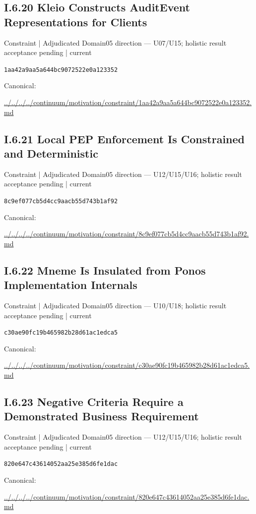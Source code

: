\documentclass[10pt,a4paper]{article}
\begin{document}
\subsection*{I.6.20 Kleio Constructs AuditEvent Representations for Clients}
{\small Constraint | Adjudicated Domain05 direction — U07/U15; holistic result acceptance pending | current}\par
\texttt{1aa42a9aa5a644bc9072522e0a123352}\par
Canonical: \par
{\footnotesize\url{../../../../continuum/motivation/constraint/1aa42a9aa5a644bc9072522e0a123352.md}}\par
\subsection*{I.6.21 Local PEP Enforcement Is Constrained and Deterministic}
{\small Constraint | Adjudicated Domain05 direction — U12/U15/U16; holistic result acceptance pending | current}\par
\texttt{8c9ef077cb5d4cc9aacb55d743b1af92}\par
Canonical: \par
{\footnotesize\url{../../../../continuum/motivation/constraint/8c9ef077cb5d4cc9aacb55d743b1af92.md}}\par
\subsection*{I.6.22 Mneme Is Insulated from Ponos Implementation Internals}
{\small Constraint | Adjudicated Domain05 direction — U10/U18; holistic result acceptance pending | current}\par
\texttt{c30ae90fc19b465982b28d61ac1edca5}\par
Canonical: \par
{\footnotesize\url{../../../../continuum/motivation/constraint/c30ae90fc19b465982b28d61ac1edca5.md}}\par
\subsection*{I.6.23 Negative Criteria Require a Demonstrated Business Requirement}
{\small Constraint | Adjudicated Domain05 direction — U12/U15/U16; holistic result acceptance pending | current}\par
\texttt{820e647c43614052aa25e385d6fe1dac}\par
Canonical: \par
{\footnotesize\url{../../../../continuum/motivation/constraint/820e647c43614052aa25e385d6fe1dac.md}}\par
\end{document}
